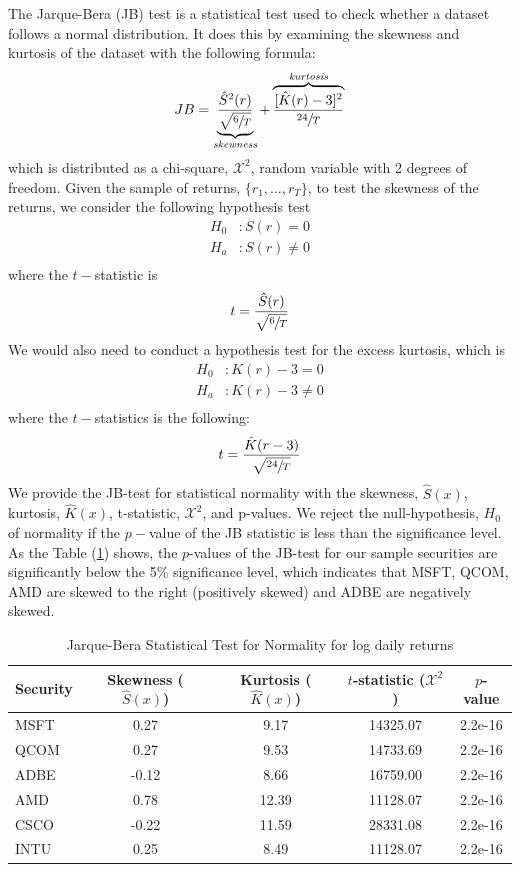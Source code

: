 \documentclass[12pt]{article}
\begin{document}
The Jarque-Bera (JB) test is a statistical test used to check whether a dataset follows a normal distribution. It does this by examining the skewness and kurtosis of the dataset with the following formula:
\begin{equation}
	JB= \underbrace{\frac{\hat{S}^2(r)}{\sqrt{\sfrac{6}{T}}}}_{\textit{skewness}}  +\overbrace{\frac{[\hat{K}(r)-3]^2}{\sfrac{24}{T}}}^{\textit{kurtosis}}
\end{equation}
which is distributed as a chi-square, $\mathcal{X}^2$, random variable with 2 degrees of freedom. Given the sample of returns, $\lbrace r_1,\ldots,r_T\rbrace$, to test the skewness of the returns, we consider the following hypothesis test
\[
\begin{aligned}
	H_0&:S(r)= 0\\
	H_a&:S(r)\neq 0\\
\end{aligned}
\]
where the $t-$statistic is 
\begin{equation}
	t=\frac{\hat{S}(r)}{\sqrt{\sfrac{6}{T}}}
\end{equation}
We would also need to conduct a hypothesis test for the excess kurtosis, which is
\[
\begin{aligned}
	H_0&:K(r)-3= 0\\
	H_a&:K(r)-3\neq 0\\
\end{aligned}
\]
where the $t-$statistics is the following:
\begin{equation}
	t=\frac{\hat{K}(r-3)}{\sqrt{\sfrac{24}{T}}}
\end{equation}
We provide the JB-test for statistical normality with the skewness, $\hat{S}(x)$, kurtosis, $\hat{K}(x)$, t-statistic, $\mathcal{X}^2$, and p-values. We reject the null-hypothesis, $H_0$ of normality if the $p-$value of the JB statistic is less than the significance level. As the Table (\ref*{tab:jbtest}) shows, the $p$-values of the JB-test for our sample securities are significantly below the 5\% significance level, which indicates that MSFT, QCOM, AMD are skewed to the right (positively skewed) and ADBE are negatively skewed.
\begin{table}[ht]
	\centering
	\caption{Jarque-Bera Statistical Test for Normality for log daily returns}
	\begin{tabular}[t]{lcccc}
		\toprule
		Security & Skewness ($\hat{S}(x)$) & Kurtosis ($\hat{K}(x)$) & $t$-statistic ($\mathcal{X}^2$) & $p$-value \\
		\midrule
		MSFT &  0.27 & 9.17  & 14325.07 & 2.2e-16  \\
		QCOM &  0.27 & 9.53  & 14733.69 & 2.2e-16 \\
		ADBE & -0.12 & 8.66  & 16759.00 & 2.2e-16 \\	   
		AMD  &  0.78 & 12.39 & 11128.07 & 2.2e-16 \\				   
		CSCO  &  -0.22 & 11.59 & 28331.08 & 2.2e-16 \\					
		INTU  &  0.25 & 8.49 & 11128.07 & 2.2e-16 \\					
		\bottomrule
	\end{tabular}\label{tab:jbtest}
\end{table}
\end{document}
